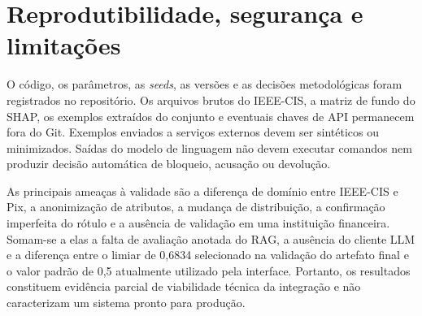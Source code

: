 \section{Reprodutibilidade, segurança e limitações}

O código, os parâmetros, as \emph{seeds}, as versões e as decisões metodológicas foram registrados no repositório. Os arquivos brutos do IEEE-CIS, a matriz de fundo do SHAP, os exemplos extraídos do conjunto e eventuais chaves de API permanecem fora do Git. Exemplos enviados a serviços externos devem ser sintéticos ou minimizados. Saídas do modelo de linguagem não devem executar comandos nem produzir decisão automática de bloqueio, acusação ou devolução.

As principais ameaças à validade são a diferença de domínio entre IEEE-CIS e Pix, a anonimização de atributos, a mudança de distribuição, a confirmação imperfeita do rótulo e a ausência de validação em uma instituição financeira. Somam-se a elas a falta de avaliação anotada do RAG, a ausência do cliente LLM e a diferença entre o limiar de 0,6834 selecionado na validação do artefato final e o valor padrão de 0,5 atualmente utilizado pela interface. Portanto, os resultados constituem evidência parcial de viabilidade técnica da integração e não caracterizam um sistema pronto para produção.
